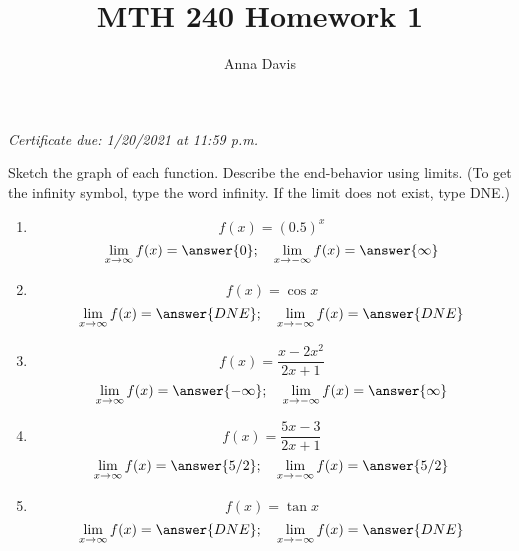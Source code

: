 \documentclass{ximera}
\author{Anna Davis} \title{MTH 240 Homework 1}
\begin{document}
\begin{abstract}

\end{abstract}
\maketitle
 \textit{Certificate due: 1/20/2021 at 11:59 p.m.}
\begin{problem}\label{prob:240hom1prob1}
Sketch the graph of each function.  Describe the end-behavior using limits.  (To get the infinity symbol, type the word infinity. If the limit does not exist, type DNE.)
\begin{enumerate}
    \item $$f(x)=(0.5)^x$$
    $$\lim_{x\to\infty}f(x)=\answer{0};\quad \lim_{x\to-\infty}f(x)=\answer{\infty}$$
    \item $$f(x)=\cos x$$
    $$\lim_{x\to\infty}f(x)=\answer{DNE};\quad \lim_{x\to-\infty}f(x)=\answer{DNE}$$
    \item $$f(x)=\frac{x-2x^2}{2x+1}$$
    $$\lim_{x\to\infty}f(x)=\answer{-\infty};\quad \lim_{x\to-\infty}f(x)=\answer{\infty}$$
    \item $$f(x)=\frac{5x-3}{2x+1}$$
    $$\lim_{x\to\infty}f(x)=\answer{5/2};\quad \lim_{x\to-\infty}f(x)=\answer{5/2}$$
    \item $$f(x)=\tan x$$
    $$\lim_{x\to\infty}f(x)=\answer{DNE};\quad \lim_{x\to-\infty}f(x)=\answer{DNE}$$
\end{enumerate}
   \end{problem}
\end{document}
